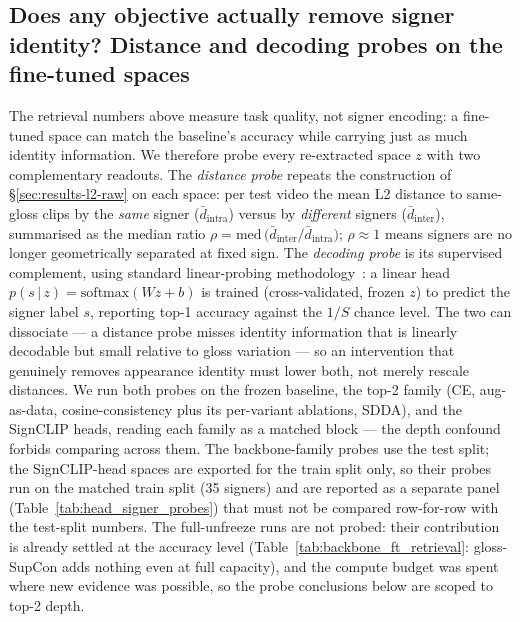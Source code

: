 \subsection{Does any objective actually remove signer identity? Distance and
decoding probes on the fine-tuned spaces}
\label{sec:results-ft-probes}
The retrieval numbers above measure task quality, not signer encoding: a
fine-tuned space can match the baseline's accuracy while carrying just as
much identity information. We therefore probe every re-extracted space $z$
with two complementary readouts. The \emph{distance probe} repeats the
construction of \S\ref{sec:results-l2-raw} on each space: per test video the
mean L2 distance to same-gloss clips by the \emph{same} signer
($\bar{d}_{\mathrm{intra}}$) versus by \emph{different} signers
($\bar{d}_{\mathrm{inter}}$), summarised as the median ratio
$\rho=\mathrm{med}\,\big(\bar{d}_{\mathrm{inter}}/\bar{d}_{\mathrm{intra}}\big)$;
$\rho\!\approx\!1$ means signers are no longer geometrically separated at
fixed sign. The \emph{decoding probe} is its supervised complement, using standard
linear-probing methodology~\cite{alainUnderstandingIntermediateLayers2017}: a linear
head $p(s\,|\,z)=\mathrm{softmax}(Wz+b)$ is trained (cross-validated, frozen
$z$) to predict the signer label $s$, reporting top-1 accuracy against the
$1/S$ chance level. The two can dissociate --- a distance probe misses
identity information that is linearly decodable but small relative to
gloss variation --- so an intervention that genuinely removes appearance
identity must lower both, not merely rescale distances. We run both probes
on the frozen baseline, the top-2 family (CE, aug-as-data,
cosine-consistency plus its per-variant ablations, SDDA), and the SignCLIP
heads, reading each family as a matched block --- the depth confound forbids
comparing across them. The backbone-family probes use the test split; the
SignCLIP-head spaces are exported for the train split only, so their probes
run on the matched train split (35 signers) and are reported as a separate
panel (Table~\ref{tab:head_signer_probes}) that must not be compared
row-for-row with the test-split numbers. The full-unfreeze runs are not probed: their
contribution is already settled at the accuracy level
(Table~\ref{tab:backbone_ft_retrieval}: gloss-SupCon adds nothing even at full
capacity), and the compute budget was spent where new evidence was possible,
so the probe conclusions below are scoped to top-2 depth.
